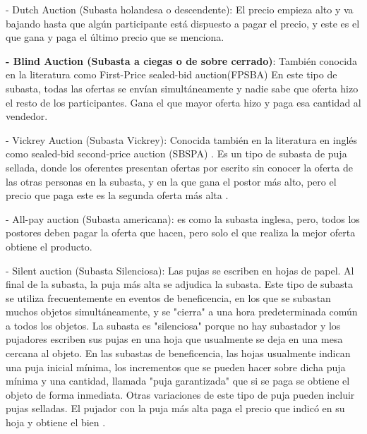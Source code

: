     - Dutch Auction (Subasta holandesa o descendente): El precio empieza alto y va bajando hasta que algún participante está 
    dispuesto a pagar el precio, y este es el que gana y paga el último precio que se menciona.

    \textbf{- Blind Auction (Subasta a ciegas o de sobre cerrado)}: También conocida en la literatura como First-Price sealed-bid auction(FPSBA)
    En este tipo de subasta, todas las ofertas se envían simultáneamente y nadie sabe que oferta hizo el resto
    de los participantes. Gana el que mayor oferta hizo y paga esa cantidad al vendedor.

    - Vickrey Auction (Subasta Vickrey): Conocida también en la literatura en inglés como sealed-bid second-price auction (SBSPA)
    . Es un tipo de subasta de puja sellada, donde los oferentes presentan ofertas por escrito sin conocer la oferta de las otras 
    personas en la subasta, y en la que gana el postor más alto, pero el precio que paga este es la segunda oferta más alta \parencite{economipediasubasta}.   

    - All-pay auction (Subasta americana): es como la subasta inglesa, pero, todos los postores deben pagar la oferta que hacen, pero solo el que realiza 
    la mejor oferta obtiene el producto.

    - Silent auction (Subasta Silenciosa):
    Las pujas se escriben en hojas de papel. Al final de la subasta, la puja más alta se adjudica la subasta. Este tipo de subasta se 
    utiliza frecuentemente en eventos de beneficencia, en los que se subastan muchos objetos simultáneamente, y se "cierra" a una hora 
    predeterminada común a todos los objetos. La subasta es "silenciosa" porque no hay subastador y los pujadores escriben sus pujas en 
    una hoja que usualmente se deja en una mesa cercana al objeto. En las subastas de beneficencia, las hojas usualmente indican una 
    puja inicial mínima, los incrementos que se pueden hacer sobre dicha puja mínima y una cantidad, llamada "puja garantizada" que si 
    se paga se obtiene el objeto de forma inmediata. Otras variaciones de este tipo de puja pueden incluir pujas selladas. El pujador 
    con la puja más alta paga el precio que indicó en su hoja y obtiene el bien \parencite{investopedia}.

